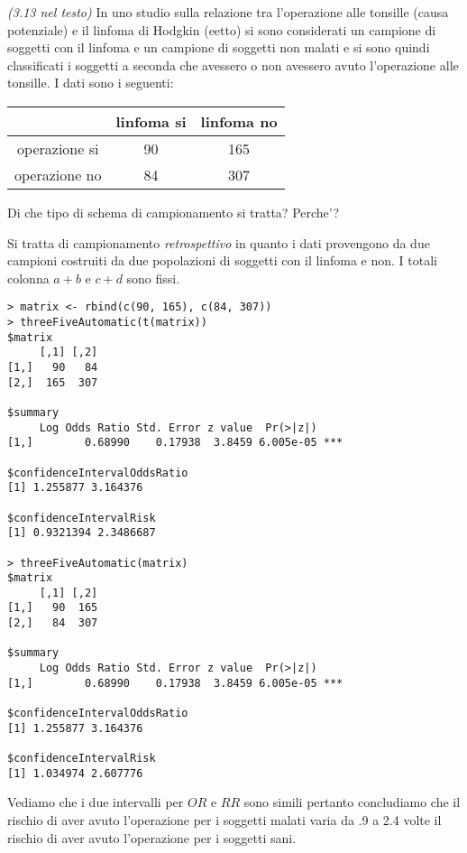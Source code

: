 \begin{exercise}{\emph{(3.13 nel testo)}}
  In uno studio sulla relazione tra l'operazione alle tonsille (causa
  potenziale) e il linfoma di Hodgkin (eetto) si sono considerati un
  campione di soggetti con il linfoma e un campione di soggetti non
  malati e si sono quindi classificati i soggetti a seconda che
  avessero o non avessero avuto l'operazione alle tonsille. I dati
  sono i seguenti:
  \begin{table}[h]              %
    \centering
    \begin{tabular}{|c|c|c|}
      \hline
       & linfoma si & linfoma no \\\hline
      operazione si & 90 & 165 \\
      operazione no & 84 & 307  \\ \hline
    \end{tabular}
  \end{table}
  Di che tipo di schema di campionamento si tratta? Perche'?
\end{exercise}
Si tratta di campionamento \emph{retrospettivo} in quanto i dati
provengono da due campioni costruiti da due popolazioni di soggetti
con il linfoma e non. I totali colonna $a + b$ e $c + d$ sono fissi.
\begin{lstlisting}
> matrix <- rbind(c(90, 165), c(84, 307))
> threeFiveAutomatic(t(matrix))
$matrix
     [,1] [,2]
[1,]   90   84
[2,]  165  307

$summary
     Log Odds Ratio Std. Error z value  Pr(>|z|)    
[1,]        0.68990    0.17938  3.8459 6.005e-05 ***

$confidenceIntervalOddsRatio
[1] 1.255877 3.164376

$confidenceIntervalRisk
[1] 0.9321394 2.3486687

> threeFiveAutomatic(matrix)
$matrix
     [,1] [,2]
[1,]   90  165
[2,]   84  307

$summary
     Log Odds Ratio Std. Error z value  Pr(>|z|)    
[1,]        0.68990    0.17938  3.8459 6.005e-05 ***

$confidenceIntervalOddsRatio
[1] 1.255877 3.164376

$confidenceIntervalRisk
[1] 1.034974 2.607776
\end{lstlisting}
Vediamo che i due intervalli per $OR$ e $RR$ sono simili pertanto
concludiamo che il rischio di aver avuto l'operazione per i soggetti
malati varia da .9 a 2.4 volte il rischio di aver avuto l'operazione
per i soggetti sani.
